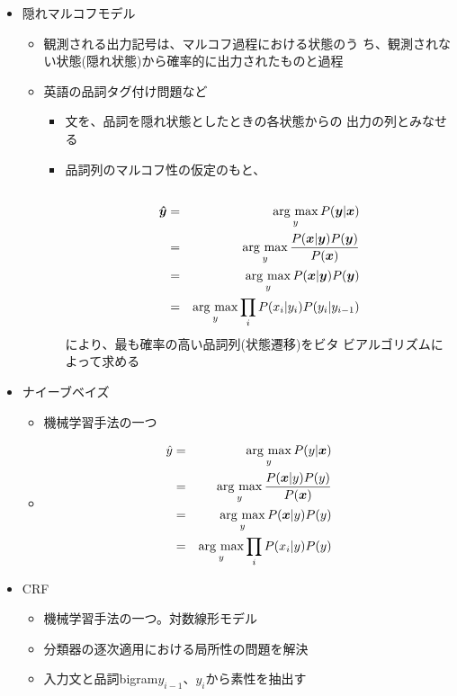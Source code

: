 \documentclass{jsarticle}
\newcommand{\argmax}{\mathop{\rm arg~max}\limits}
\begin{document}
\begin{itemize}
\begin{itemize}
\begin{itemize}
	      \end{itemize}
	\item 隠れマルコフモデル
	      \begin{itemize}
	       \item 観測される出力記号は、マルコフ過程における状態のう
		     ち、観測されない状態(隠れ状態)から確率的に出力されたものと過程
	       \item 英語の品詞タグ付け問題など
		     \begin{itemize}
		      \item 文を、品詞を隠れ状態としたときの各状態からの
			    出力の列とみなせる
		      \item 品詞列のマルコフ性の仮定のもと、
		      \begin{eqnarray*}\\
		       \bm{\hat{y}} & = & \argmax_{y} P(\bm{y}|\bm{x}) \\
		       &=& \argmax_{y}
			\frac{P(\bm{x}|\bm{y})P(\bm{y})}{P(\bm{x})} \\
		       &=& \argmax_{y}P(\bm{x}|\bm{y})P(\bm{y}) \\
		       &=& \argmax_{y} \prod_i{P(x_i|y_i)P(y_i|y_{i-1})}
		      \end{eqnarray*}
			    により、最も確率の高い品詞列(状態遷移)をビタ
			    ビアルゴリズムによって求める
		     \end{itemize}
	      \end{itemize}
	\item ナイーブベイズ
	      \begin{itemize}
	       \item 機械学習手法の一つ
	       \item \begin{eqnarray*}
		\hat{y} & = & \argmax_{y} P(y|\bm{x}) \\
		      &=& \argmax_{y}
		       \frac{P(\bm{x}|y)P(y)}{P(\bm{x})} \\
		      &=& \argmax_{y}P(\bm{x}|y)P(y) \\
&=& \argmax_{y} \prod_i{P(x_i|y)P(y)}
		     \end{eqnarray*}
	      \end{itemize}
	\item CRF
	      \begin{itemize}
	       \item 機械学習手法の一つ。対数線形モデル
	       \item 分類器の逐次適用における局所性の問題を解決
	       \item 入力文と品詞bigram$y_{i-1}$、$y_i$から素性を抽出す

\end{itemize}
\end{itemize}
\end{itemize}
\end{document}
